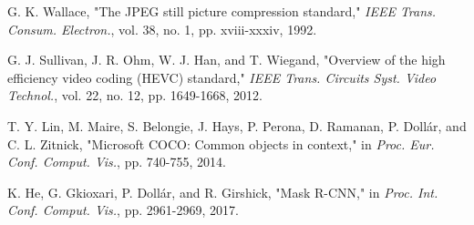 \documentclass[conference]{IEEEtran}
\begin{document}
\begin{thebibliography}{00}
G. K. Wallace, "The JPEG still picture compression standard," \textit{IEEE Trans. Consum. Electron.}, vol. 38, no. 1, pp. xviii-xxxiv, 1992.

G. J. Sullivan, J. R. Ohm, W. J. Han, and T. Wiegand, "Overview of the high efficiency video coding (HEVC) standard," \textit{IEEE Trans. Circuits Syst. Video Technol.}, vol. 22, no. 12, pp. 1649-1668, 2012.

T. Y. Lin, M. Maire, S. Belongie, J. Hays, P. Perona, D. Ramanan, P. Dollár, and C. L. Zitnick, "Microsoft COCO: Common objects in context," in \textit{Proc. Eur. Conf. Comput. Vis.}, pp. 740-755, 2014.

K. He, G. Gkioxari, P. Dollár, and R. Girshick, "Mask R-CNN," in \textit{Proc. Int. Conf. Comput. Vis.}, pp. 2961-2969, 2017.

\end{thebibliography}
\end{document}

